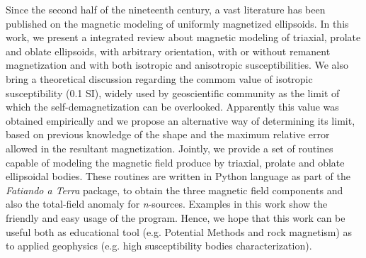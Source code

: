 \begin{foreignabstract}

Since the second half of the nineteenth century, a vast literature has been published on the magnetic modeling of uniformly magnetized ellipsoids. In this work, we present a integrated review about magnetic modeling of triaxial, prolate and oblate ellipsoids, with arbitrary orientation, with or without remanent magnetization and with both isotropic and anisotropic susceptibilities. We also bring a theoretical discussion regarding the commom value of isotropic susceptibility (0.1 SI), widely used by geoscientific community as the limit of which the self-demagnetization can be overlooked. Apparently this value was obtained empirically and we propose an alternative way of determining its limit, based on previous knowledge of the shape and the maximum relative error allowed in the resultant magnetization. Jointly, we provide a set of routines capable of modeling the magnetic field produce by triaxial, prolate and oblate ellipsoidal bodies. These routines are written in Python language as part of the \textit{Fatiando a Terra} package, to obtain the three magnetic field components and also the total-field anomaly for \textit{n}-sources. Examples in this work show the friendly and easy usage of the program. Hence, we hope that this work can be useful both as educational tool (e.g. Potential Methods and rock magnetism) as to applied geophysics (e.g. high susceptibility bodies characterization).

\end{foreignabstract}
